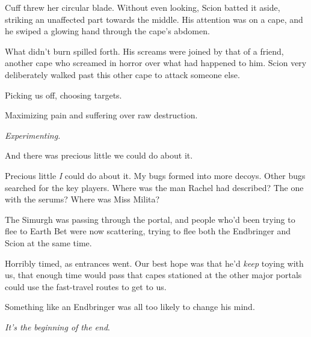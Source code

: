 Cuff threw her circular blade.  Without even looking, Scion batted it aside, striking an unaffected part towards the middle.  His attention was on a cape, and he swiped a glowing hand through the cape's abdomen.



What didn't burn spilled forth.  His screams were joined by that of a friend, another cape who screamed in horror over what had happened to him.  Scion very deliberately walked past this other cape to attack someone else.



Picking us off, choosing targets.



Maximizing pain and suffering over raw destruction.



\emph{Experimenting.}



And there was precious little we could do about it.



Precious little \emph{I} could do about it.  My bugs formed into more decoys.  Other bugs searched for the key players.  Where was the man Rachel had described?  The one with the serums?  Where was Miss Milita?



The Simurgh was passing through the portal, and people who'd been trying to flee to Earth Bet were now scattering, trying to flee both the Endbringer and Scion at the same time.



Horribly timed, as entrances went.  Our best hope was that he'd \emph{keep} toying with us, that enough time would pass that capes stationed at the other major portals could use the fast-travel routes to get to us.



Something like an Endbringer was all too likely to change his mind.



\emph{It's the beginning of the end}.





